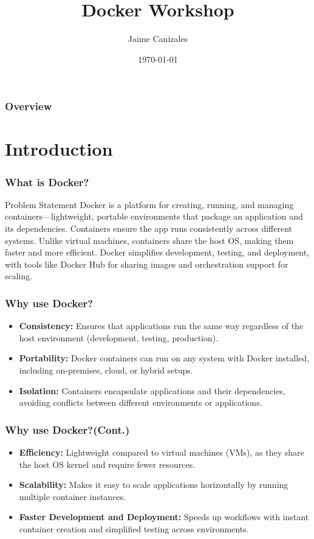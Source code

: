 \documentclass{beamer}
\title[Docker Workshop]{Docker Workshop}
\author{Jaime Canizales}
\institute[Hunter College] 
{
City University of New York \\ 
\medskip
\textit{jaime.canizales@hunter.cuny.edu} 
}
\date{\today}
\begin{document}
\begin{frame}
\titlepage 
\end{frame}


\begin{frame} \frametitle{Overview} 
\tableofcontents
\end{frame}


\section{Introduction}
\begin{frame}\frametitle{What is Docker?}
\begin{block}{Problem Statement}
Docker is a platform for creating, running, and managing containers—lightweight,
portable environments that package an application and its dependencies. 
Containers ensure the app runs consistently across different systems. Unlike 
virtual machines, containers share the host OS, making them faster and more 
efficient. Docker simplifies development, testing, and deployment, with tools
like Docker Hub for sharing images and orchestration support for scaling.
\end{block}
\end{frame}


\begin{frame}\frametitle{Why use Docker?}
\begin{itemize}
\item \textbf{Consistency:} Ensures that applications run the same way regardless of the host environment (development, testing, production).
\item \textbf{Portability:} Docker containers can run on any system with Docker installed, including on-premises, cloud, or hybrid setups.
\item \textbf{Isolation:} Containers encapsulate applications and their dependencies, avoiding conflicts between different environments or applications.
\end{itemize}
\end{frame}


\begin{frame}\frametitle{Why use Docker?(Cont.)}
\begin{itemize}
\item \textbf{Efficiency:} Lightweight compared to virtual machines (VMs), as they share the host OS kernel and require fewer resources.
\item \textbf{Scalability:} Makes it easy to scale applications horizontally by running multiple container instances.
\item \textbf{Faster Development and Deployment:} Speeds up workflows with instant container creation and simplified testing across environments.
\end{itemize}
\end{frame}
\end{document}
